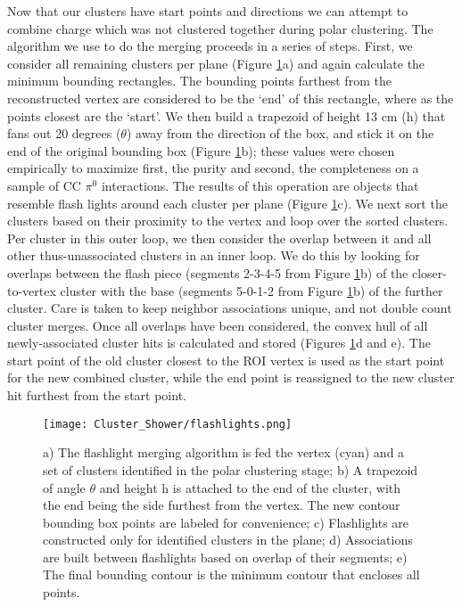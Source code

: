 \par Now that our clusters have start points and directions we can attempt to combine charge which was not clustered together during polar clustering. The algorithm we use to do the merging proceeds in a series of steps.  First, we consider all remaining clusters per plane (Figure \ref{fig:misc_flashlights}a) and again calculate the minimum bounding rectangles. The bounding points farthest from the reconstructed vertex are considered to be the `end' of this rectangle, where as the points closest are the `start'.  We then build a trapezoid of height 13 cm (h) that fans out 20 degrees ($\theta$) away from the direction of the box, and stick it on the end of the original bounding box (Figure \ref{fig:misc_flashlights}b); these values were chosen empirically to maximize first, the purity and second, the completeness on a sample of CC $\pi^0$ interactions.  The results of this operation are objects that resemble flash lights around each cluster per plane (Figure \ref{fig:misc_flashlights}c). We next sort the clusters based on their proximity to the vertex and loop over the sorted clusters. Per cluster in this outer loop, we then consider the overlap between it and all other thus-unassociated clusters in an inner loop.  We do this by looking for overlaps between the flash piece (segments 2-3-4-5 from Figure \ref{fig:misc_flashlights}b) of the closer-to-vertex cluster with the base (segments 5-0-1-2 from Figure \ref{fig:misc_flashlights}b) of the further cluster. Care is taken to keep neighbor associations unique, and not double count cluster merges. Once all overlaps have been considered, the convex hull \cite{bib:convexHull} of all newly-associated cluster hits is calculated and stored (Figures \ref{fig:misc_flashlights}d and e). The start point of the old cluster closest to the ROI vertex is used as the start point for the new combined cluster, while the end point is reassigned to the new cluster hit furthest from the start point.

\begin{figure}[h!]
\centering
\texttt{[image: Cluster\_Shower/flashlights.png]}
\caption{ a) The flashlight merging algorithm is fed the vertex (cyan) and a set of clusters identified in the polar clustering stage; b) A trapezoid of angle $\theta$ and height h is attached to the end of the cluster, with the end being the side furthest from the vertex.  The new contour bounding box points are labeled for convenience; c) Flashlights are constructed only for identified clusters in the plane; d) Associations are built between flashlights based on overlap of their segments; e) The final bounding contour is the minimum contour that encloses all points.  }
\label{fig:misc_flashlights}
\end{figure}

